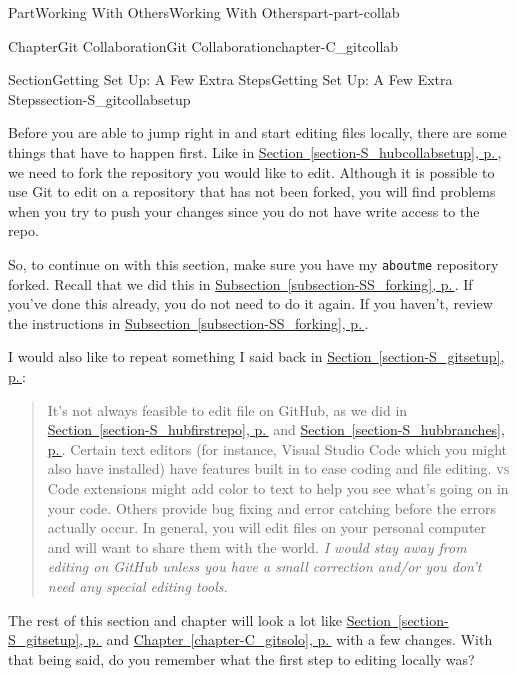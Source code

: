 \documentclass[twoside,10pt,]{book}
\newcommand{\xreffont}{\relax}
\newcommand{\mono}[1]{\texttt{#1}}
\newcommand{\initialism}[1]{\textsc{\MakeLowercase{#1}}}
\begin{document}
\begin{partptx}{Part}{Working With Others}{}{Working With Others}{}{}{part-part-collab}
\begin{chapterptx}{Chapter}{Git Collaboration}{}{Git Collaboration}{}{}{chapter-C_gitcollab}
\begin{sectionptx}{Section}{Getting Set Up: A Few Extra Steps}{}{Getting Set Up: A Few Extra Steps}{}{}{section-S_gitcollabsetup}
%
\begin{introduction}{}%
Before you are able to jump right in and start editing files locally, there are some things that have to happen first. Like in \hyperref[section-S_hubcollabsetup]{Section~{\xreffont\ref{section-S_hubcollabsetup}}, p.\,\pageref{section-S_hubcollabsetup}}, we need to fork the repository you would like to edit. Although it is possible to use Git to edit on a repository that has not been forked, you will find problems when you try to push your changes since you do not have write access to the repo.%
\par
So, to continue on with this section, make sure you have my \mono{aboutme} repository forked. Recall that we did this in \hyperref[subsection-SS_forking]{Subsection~{\xreffont\ref{subsection-SS_forking}}, p.\,\pageref{subsection-SS_forking}}. If you've done this already, you do not need to do it again. If you haven't, review the instructions in \hyperref[subsection-SS_forking]{Subsection~{\xreffont\ref{subsection-SS_forking}}, p.\,\pageref{subsection-SS_forking}}.%
\par
I would also like to repeat something I said back in \hyperref[section-S_gitsetup]{Section~{\xreffont\ref{section-S_gitsetup}}, p.\,\pageref{section-S_gitsetup}}:%
\begin{quote}%
It's not always feasible to edit file on GitHub, as we did in \hyperref[section-S_hubfirstrepo]{Section~{\xreffont\ref{section-S_hubfirstrepo}}, p.\,\pageref{section-S_hubfirstrepo}} and \hyperref[section-S_hubbranches]{Section~{\xreffont\ref{section-S_hubbranches}}, p.\,\pageref{section-S_hubbranches}}. Certain text editors (for instance, Visual Studio Code which you might also have installed) have features built in to ease coding and file editing. \initialism{VS} Code extensions might add color to text to help you see what's going on in your code. Others provide bug fixing and error catching before the errors actually occur. In general, you will edit files on your personal computer and will want to share them with the world. \emph{I would stay away from editing on GitHub unless you have a small correction and\slash{}or you don't need any special editing tools.}%
\end{quote}
The rest of this section and chapter will look a lot like \hyperref[section-S_gitsetup]{Section~{\xreffont\ref{section-S_gitsetup}}, p.\,\pageref{section-S_gitsetup}} and \hyperref[chapter-C_gitsolo]{Chapter~{\xreffont\ref{chapter-C_gitsolo}}, p.\,\pageref{chapter-C_gitsolo}} with a few changes. With that being said, do you remember what the first step to editing locally was?%

\end{introduction}
\end{sectionptx}
\end{chapterptx}
\end{partptx}
\end{document}
